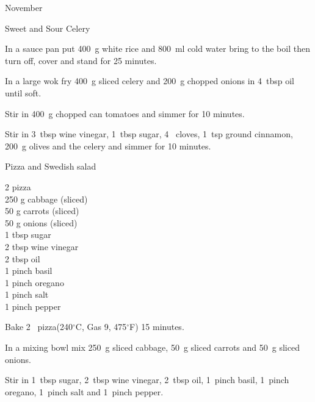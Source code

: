\begin{menu}{November}
\begin{recipe}{2}{Sweet and Sour Celery}
\begin{ingredients}
		\end{ingredients}
	
    \begin{instructions}
    \item 
      In a
      sauce pan
      put
      400~g  white rice
      and
      800~ml  cold water
      bring to the boil then turn off, cover and stand for 25 minutes.
    \item 
        In a large wok fry
        400~g sliced celery
        and
        200~g chopped onions
        in
        4~tbsp  oil
        until soft.
      \item 
        Stir in
        400~g chopped can tomatoes
        and simmer for 10 minutes.
      \item 
        Stir in
        3~tbsp  wine vinegar,
        1~tbsp  sugar,
        4~  cloves,
        1~tsp  ground cinnamon,
        200~g  olives
        and the celery
        and simmer for 10 minutes.
      
    \end{instructions}
    \end{recipe}%
  
    \begin{recipe}{1}{Pizza and Swedish salad}%
		\begin{ingredients}
		2  pizza  \\
	250 g cabbage (sliced) \\
	50 g carrots (sliced) \\
	50 g onions (sliced) \\
	1 tbsp sugar  \\
	2 tbsp wine vinegar  \\
	2 tbsp oil  \\
	1 pinch basil  \\
	1 pinch oregano  \\
	1 pinch salt  \\
	1 pinch pepper  \\
	
		\end{ingredients}
	
	
    \begin{instructions}
    \item 
        Bake 2~  pizza(240$^{\circ}$C, Gas 9, 475$^{\circ}$F) 15 minutes.
      \item 
        In a mixing bowl mix
        250~g sliced cabbage,
        50~g sliced carrots
        and
        50~g sliced onions.
      \item 
        Stir in
        1~tbsp  sugar,
        2~tbsp  wine vinegar,
        2~tbsp  oil,
        1~pinch  basil,
        1~pinch  oregano,
        1~pinch  salt
        and
        1~pinch  pepper.
      

\end{instructions}
\end{recipe}
\end{menu}
